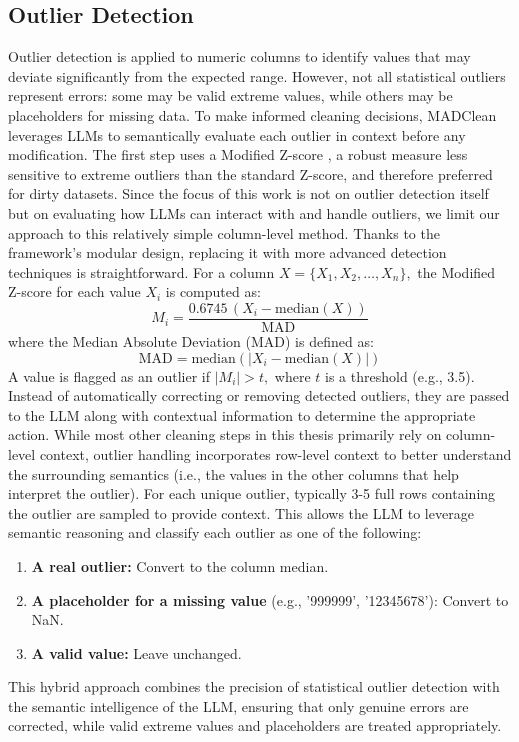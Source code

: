 \subsection{Outlier Detection}
Outlier detection is applied to numeric columns to identify values that may deviate significantly from the expected range. 
However, not all statistical outliers represent errors: some may be valid extreme values, while others may be placeholders for missing data. 
To make informed cleaning decisions, MADClean leverages LLMs to semantically evaluate each outlier in context before any modification.
\newline\newline
The first step uses a Modified Z-score \cite{MZSCORE}, a robust measure less sensitive to extreme outliers than the standard Z-score, and therefore preferred for dirty datasets. 
Since the focus of this work is not on outlier detection itself but on evaluating how LLMs can interact with and handle outliers, we limit our approach to this relatively simple column-level method. 
Thanks to the framework's modular design, replacing it with more advanced detection techniques is straightforward. 
For a column  \( X = \{ X_1, X_2, \dots, X_n \},\) the Modified Z-score for each value \(X_i\) is computed as:
\[
M_i = \frac{0.6745 \, (X_i - \text{median}(X))}{\text{MAD}}
\]
where the Median Absolute Deviation (MAD) is defined as:
\[
\text{MAD} = \text{median}\left( \left| X_i - \text{median}(X) \right| \right)
\]
A value is flagged as an outlier if \( |M_i| > t, \) where \(t\) is a threshold (e.g., 3.5).
\newline\newline
Instead of automatically correcting or removing detected outliers, they are passed to the LLM along with contextual information to determine the appropriate action. 
While most other cleaning steps in this thesis primarily rely on column-level context, outlier handling incorporates row-level context to better understand the surrounding semantics (i.e., the values in the other columns that help interpret the outlier).
For each unique outlier, typically 3-5 full rows containing the outlier are sampled to provide context. 
This allows the LLM to leverage semantic reasoning and classify each outlier as one of the following:
\begin{enumerate}
    \item \textbf{A real outlier:} Convert to the column median.
    \item \textbf{A placeholder for a missing value} (e.g., '999999', '12345678'): Convert to NaN.
    \item \textbf{A valid value:} Leave unchanged.
\end{enumerate}
This hybrid approach combines the precision of statistical outlier detection with the semantic intelligence of the LLM, ensuring that only genuine errors are corrected, while valid extreme values and placeholders are treated appropriately.

